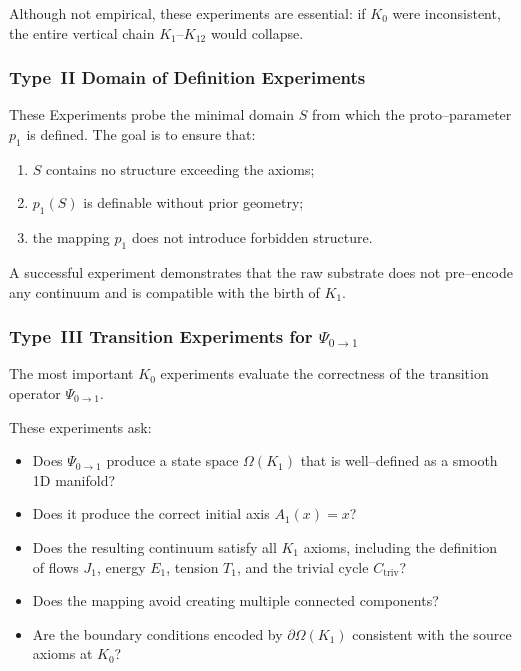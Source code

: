 Although not empirical, these experiments are essential:
if $K_0$ were inconsistent, the entire vertical chain $K_1$–$K_{12}$ would
collapse.


\subsubsection{Type~II Domain of Definition Experiments}

These Experiments probe the minimal domain $S$ from which the
proto–parameter $p_1$ is defined.
The goal is to ensure that:

\begin{enumerate}
    \item $S$ contains no structure exceeding the axioms;
    \item $p_1(S)$ is definable without prior geometry;
    \item the mapping $p_1$ does not introduce forbidden structure.
\end{enumerate}

A successful experiment demonstrates that the raw substrate does not
pre–encode any continuum and is compatible with the birth of $K_1$.


\subsubsection{Type~III Transition Experiments for $\Psi_{0\to 1}$}

The most important $K_0$ experiments evaluate the correctness of the
transition operator $\Psi_{0\to 1}$.

These experiments ask:
\begin{itemize}
    \item Does $\Psi_{0\to 1}$ produce a state space $\Omega(K_1)$ that is
          well–defined as a smooth 1D manifold?
    \item Does it produce the correct initial axis $A_1(x)=x$?
    \item Does the resulting continuum satisfy all $K_1$ axioms, including
          the definition of flows $J_1$, energy $E_1$, tension $T_1$, and
          the trivial cycle $C_{\mathrm{triv}}$?
    \item Does the mapping avoid creating multiple connected components?
    \item Are the boundary conditions encoded by $\partial\Omega(K_1)$
          consistent with the source axioms at $K_0$?
\end{itemize}

